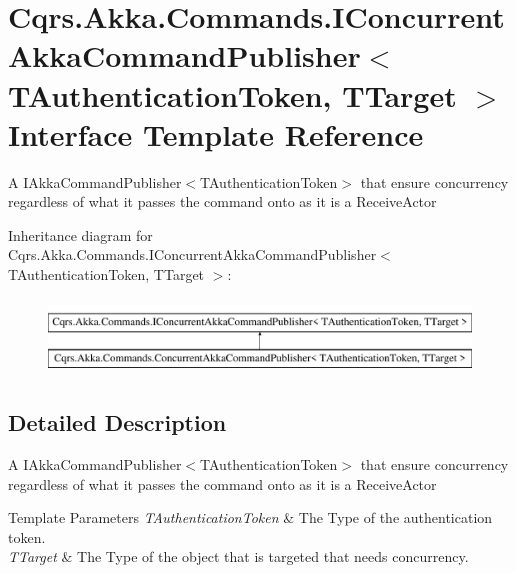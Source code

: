 \hypertarget{interfaceCqrs_1_1Akka_1_1Commands_1_1IConcurrentAkkaCommandPublisher}{}\section{Cqrs.\+Akka.\+Commands.\+I\+Concurrent\+Akka\+Command\+Publisher$<$ T\+Authentication\+Token, T\+Target $>$ Interface Template Reference}
\label{interfaceCqrs_1_1Akka_1_1Commands_1_1IConcurrentAkkaCommandPublisher}


A I\+Akka\+Command\+Publisher$<$\+T\+Authentication\+Token$>$ that ensure concurrency regardless of what it passes the command onto as it is a Receive\+Actor  


Inheritance diagram for Cqrs.\+Akka.\+Commands.\+I\+Concurrent\+Akka\+Command\+Publisher$<$ T\+Authentication\+Token, T\+Target $>$\+:\begin{figure}[H]
\begin{center}
\leavevmode
\includegraphics[height=2.000000cm]{interfaceCqrs_1_1Akka_1_1Commands_1_1IConcurrentAkkaCommandPublisher}
\end{center}
\end{figure}


\subsection{Detailed Description}
A I\+Akka\+Command\+Publisher$<$\+T\+Authentication\+Token$>$ that ensure concurrency regardless of what it passes the command onto as it is a Receive\+Actor 


\begin{DoxyTemplParams}{Template Parameters}
{\em T\+Authentication\+Token} & The Type of the authentication token.\\
\hline
{\em T\+Target} & The Type of the object that is targeted that needs concurrency.\\
\hline
\end{DoxyTemplParams}
